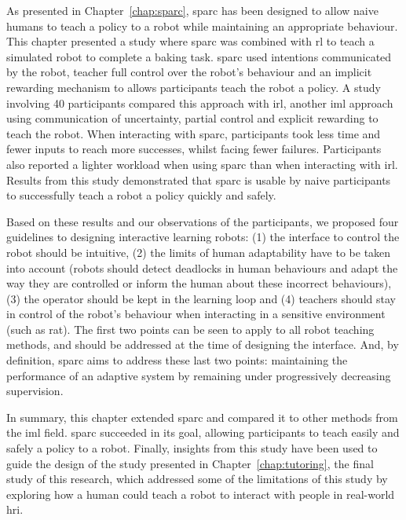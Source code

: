 As presented in Chapter~\ref{chap:sparc}, \gls{sparc} has been designed to allow naive humans to teach a policy to a robot while maintaining an appropriate behaviour. This chapter presented a study where \gls{sparc} was combined with \gls{rl} to teach a simulated robot to complete a baking task. \gls{sparc} used intentions communicated by the robot, teacher full control over the robot's behaviour and an implicit rewarding mechanism to allows participants teach the robot a policy. A study involving 40 participants compared this approach with \gls{irl}, another \gls{iml} approach using communication of uncertainty, partial control and explicit rewarding to teach the robot. When interacting with \gls{sparc}, participants took less time and fewer inputs to reach more successes, whilst facing fewer failures. Participants also reported a lighter workload when using \gls{sparc} than when interacting with \gls{irl}. Results from this study demonstrated that \gls{sparc} is usable by naive participants to successfully teach a robot a policy quickly and safely.

Based on these results and our observations of the participants, we proposed four guidelines to designing interactive learning robots: (1) the interface to control the robot should be intuitive, (2) the limits of human adaptability have to be taken into account (robots should detect deadlocks in human behaviours and adapt the way they are controlled or inform the human about these incorrect behaviours), (3) the operator should be kept in the learning loop and (4) teachers should stay in control of the robot's behaviour when interacting in a sensitive environment (such as \acrlong{rat}). The first two points can be seen to apply to all robot teaching methods, and should be addressed at the time of designing the interface. And, by definition, \gls{sparc} aims to address these last two points: maintaining the performance of an adaptive system by remaining under progressively decreasing supervision.

In summary, this chapter extended \gls{sparc} and compared it to other methods from the \gls{iml} field. \gls{sparc} succeeded in its goal, allowing participants to teach easily and safely a policy to a robot. Finally, insights from this study have been used to guide the design of the study presented in Chapter~\ref{chap:tutoring}, the final study of this research, which addressed some of the limitations of this study by exploring how a human could teach a robot to interact with people in real-world \gls{hri}.

